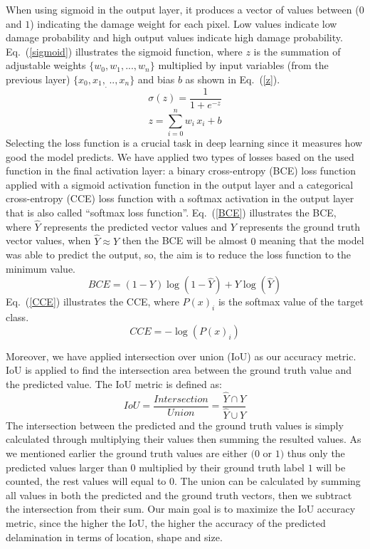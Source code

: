 When using sigmoid in the output layer, it produces a vector of values between (\(0\) and \(1\)) indicating the damage weight for each pixel. 
Low values indicate low damage probability and high output values indicate high damage probability. Eq.~(\ref{sigmoid}) illustrates the sigmoid function, where \(z\) is the summation of adjustable weights \(\{w_0,w_1,...,w_n \}\) multiplied by input variables (from the previous layer) \(\{x_0,x_1,_...,x_n\}\) and bias \(b\) as shown in Eq.~(\ref{z}).	
	\begin{equation}
		\sigma(z) = \frac{1}{1+e^{-z}}
		\label{sigmoid}
	\end{equation}
	\begin{equation}
		z= \sum_{i=0}^{n}  w_i\, x_i +b
		\label{z}
	\end{equation}
Selecting the loss function is a crucial task in deep learning since it measures how good the model predicts.
We have applied two types of losses based on the used function in the final activation layer: a binary cross-entropy (BCE) loss function applied with a sigmoid activation function in the output layer and a categorical cross-entropy (CCE) loss function with a softmax activation in the output layer that is also called \enquote{softmax loss function}.
Eq.~(\ref{BCE}) illustrates the BCE, where \(\hat{Y}\) represents the predicted vector values and \(Y\) represents the ground truth vector values, when \(\hat{Y} \approx Y\) then the BCE will be almost \(0\) meaning that the model was able to predict the output, so, the aim is to reduce the loss function to the minimum value.
	\begin{equation}
		BCE = (1-Y)\log(1-\hat{Y})+Y\log(\hat{Y})
		\label{BCE}
	\end{equation}
Eq.~(\ref{CCE}) illustrates the CCE, where \( P(x)_{i}\) is the softmax value of the target class. 
	\begin{equation}
	CCE = -\log\left( P(x)_{i} \right)
	\label{CCE}
	\end{equation}

Moreover, we have applied intersection over union (IoU) as our accuracy metric. 
IoU is applied to find the intersection area between the ground truth value and the predicted value.  
The IoU metric is defined as:
\begin{equation}
IoU = \frac{Intersection}{Union} = \frac{\hat{Y} \cap Y}{\hat{Y} \cup Y} 
\label{IoU}
\end{equation}
The intersection between the predicted and the ground truth values is simply calculated through multiplying their values then summing the resulted values.
As we mentioned earlier the ground truth values are either \((0\) or \(1)\) thus only the predicted values larger than \(0\) multiplied by their ground truth label \(1\) will be counted, the rest values will equal to \(0\). 
The union can be calculated by summing all values in both the predicted and the ground truth  vectors, then we subtract the intersection from their sum.
Our main goal is to maximize the IoU accuracy metric, since the higher the IoU, the higher the accuracy of the predicted delamination in terms of location, shape and size.

